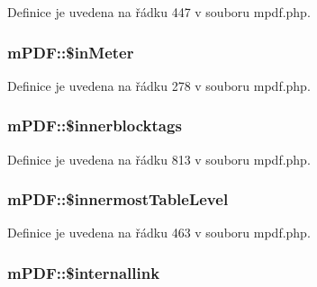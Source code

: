 Definice je uvedena na řádku 447 v souboru mpdf.\-php.

\hypertarget{classm_p_d_f_a417cc47cce5ea93fac0c4a0a66be3f24}{
\subsubsection[{\$in\-Meter}]{\setlength{\rightskip}{0pt plus 5cm}m\-P\-D\-F\-::\$in\-Meter}}\label{classm_p_d_f_a417cc47cce5ea93fac0c4a0a66be3f24}


Definice je uvedena na řádku 278 v souboru mpdf.\-php.

\hypertarget{classm_p_d_f_ab5505ebe867ac16aae7d6ecd07584a51}{
\subsubsection[{\$innerblocktags}]{\setlength{\rightskip}{0pt plus 5cm}m\-P\-D\-F\-::\$innerblocktags}}\label{classm_p_d_f_ab5505ebe867ac16aae7d6ecd07584a51}


Definice je uvedena na řádku 813 v souboru mpdf.\-php.

\hypertarget{classm_p_d_f_a9d6d18a17137700e73d02bd6006b97d4}{
\subsubsection[{\$innermost\-Table\-Level}]{\setlength{\rightskip}{0pt plus 5cm}m\-P\-D\-F\-::\$innermost\-Table\-Level}}\label{classm_p_d_f_a9d6d18a17137700e73d02bd6006b97d4}


Definice je uvedena na řádku 463 v souboru mpdf.\-php.

\hypertarget{classm_p_d_f_a71429a36c210dbf387e2155bd65da18d}{
\subsubsection[{\$internallink}]{\setlength{\rightskip}{0pt plus 5cm}m\-P\-D\-F\-::\$internallink}}\label{classm_p_d_f_a71429a36c210dbf387e2155bd65da18d}


